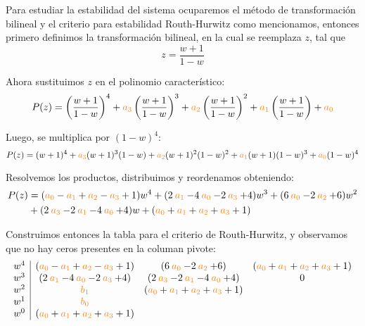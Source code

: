 Para estudiar la estabilidad del sistema ocuparemos el método de transformación
bilineal y el criterio para estabilidad Routh-Hurwitz como mencionamos, entonces
primero definimos la transformación bilineal, en la cual se reemplaza $z$, tal que 
\begin{equation}
    z = \frac{w+1}{1-w}
\end{equation}

Ahora sustituimos $z$ en el polinomio característico:
\begin{equation}
    P(z) = \left(\frac{w+1}{1-w}\right)^4 + \nara{a_3}\left(\frac{w+1}{1-w}\right)^3 + \nara{a_2} \left(\frac{w+1}{1-w}\right)^2 + \nara{a_1} \left(\frac{w+1}{1-w}\right) + \nara{a_0}
\end{equation}

Luego, se multiplica por $(1-w)^4$:
\begin{equation}
    P(z) = ({w+1})^4+ \nara{a_3}({w+1})^3(1-w)  + \nara{a_2} ({w+1})^2 (1-w) ^2+ \nara{a_1} ({w+1})(1-w)^3 + \nara{a_0}(1-w)^4
\end{equation}


Resolvemos los productos, distribuimos y reordenamos obteniendo:
\begin{align}
  P(z) &= (\nara{a_0} - \nara{a_1} + \nara{a_2} -\nara{a_3} + 1)w^4 +( 2\nara{a_1} - 4\nara{a_0} - 2 \nara{a_3} +4 ) w^3  
    + ( 6\nara{a_0} - 2\nara{a_2} +6 ) w^2 \nonumber \\
    &+ (2\nara{a_3} - 2\nara{a_1} - 4\nara{a_0} + 4 ) w +
    (\nara{a_0} + \nara{a_1} + \nara{a_2} +\nara{a_3} + 1)
\end{align}

Construimos entonces la tabla para el criterio de Routh-Hurwitz, y observamos
que no hay ceros presentes en la columan pivote:
\begin{equation}
  \begin{array}{c|ccc}
    w^4 & (\nara{a_0} - \nara{a_1} + \nara{a_2} -\nara{a_3} + 1) & ( 6\nara{a_0} - 2\nara{a_2} +6 )  &  (\nara{a_0} + \nara{a_1} + \nara{a_2} +\nara{a_3} + 1)\\
    w^3 &( 2\nara{a_1} - 4\nara{a_0} - 2 \nara{a_3} +4 )   &(2\nara{a_3} - 2\nara{a_1} - 4\nara{a_0} + 4 )  & 0\\
    w^2 & \nara{b_1} &  (\nara{a_0} + \nara{a_1} + \nara{a_2} +\nara{a_3} + 1)\\
    w^1 & \nara{b_0} &  \\
    w^0 &    (\nara{a_0} + \nara{a_1} + \nara{a_2} +\nara{a_3} + 1)  & 
  \end{array}
\end{equation}

